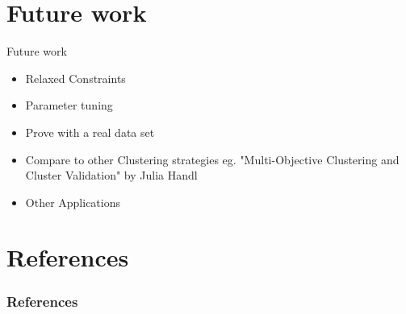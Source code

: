 \documentclass{beamer}
\begin{document}
    \section{Future work}
    \begin{frame}{Future work}
        \begin{itemize}
            \item Relaxed Constraints
            \item Parameter tuning
            \item Prove with a real data set
            \item Compare to other Clustering strategies eg. "Multi-Objective Clustering and Cluster Validation" by Julia Handl %
            \item Other Applications
        \end{itemize}

    \end{frame}
        
    \section*{References}
    \begin{frame}[allowframebreaks]
      \frametitle{References}
      
      
    \end{frame}    
    
\end{document}
